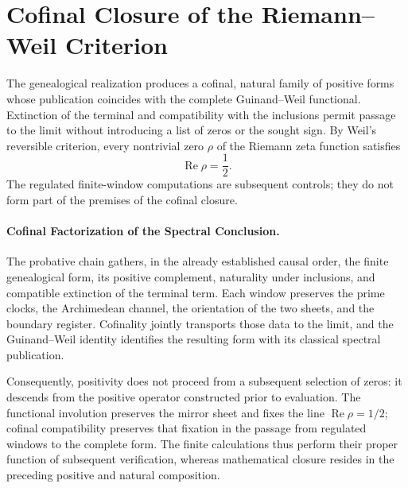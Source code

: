 \section{Cofinal Closure of the Riemann--Weil Criterion}

The genealogical realization produces a cofinal, natural family of
positive forms whose publication coincides with the complete
Guinand--Weil functional. Extinction of the terminal and compatibility with the
inclusions permit passage to the limit without introducing a list of zeros or the
sought sign. By Weil's reversible criterion, every nontrivial zero
\(\rho\) of the Riemann zeta function satisfies
\[
  \operatorname{Re}\rho=\frac12.
\]
The regulated finite-window computations are subsequent controls; they do not form
part of the premises of the cofinal closure.

\paragraph{Cofinal Factorization of the Spectral Conclusion.}
The probative chain gathers, in the already established causal order, the finite
genealogical form, its positive complement, naturality under inclusions, and
compatible extinction of the terminal term. Each window preserves the prime
clocks, the Archimedean channel, the orientation of the two sheets, and the boundary
register. Cofinality jointly transports those data to the limit, and the
Guinand--Weil identity identifies the resulting form with its classical
spectral publication.

Consequently, positivity does not proceed from a subsequent selection of
zeros: it descends from the positive operator constructed prior to evaluation. The
functional involution preserves the mirror sheet and fixes the line
\(\operatorname{Re}\rho=1/2\); cofinal compatibility preserves that fixation
in the passage from regulated windows to the complete form. The finite
calculations thus perform their proper function of subsequent verification, whereas
mathematical closure resides in the preceding positive and natural composition.

